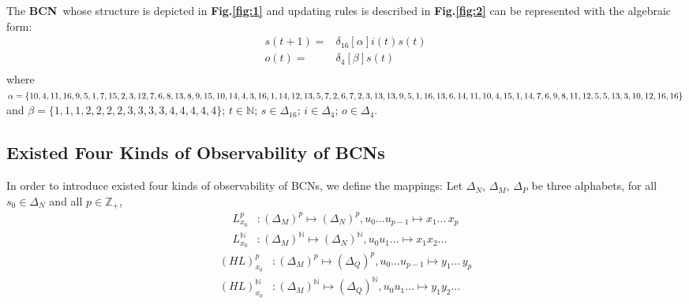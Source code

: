 \documentclass[letterpaper, 10 pt, conference]{ieeeconf}  %
\def \BCN {{\bf BCN}}
\begin{document}
The \BCN\ whose structure is depicted in {\bf Fig.\ref{fig:1}} and updating rules is described in {\bf Fig.\ref{fig:2}} can be represented with the algebraic form:
\begin{equation}
\begin{split}
s(t+1) =&\delta_{16}[\alpha]i(t)s(t)\\
o(t) =&\delta_4[\beta]s(t)\\
\end{split}
\end{equation}
where $\alpha=\{10,4,11,16,9,5,1, 7,15,2,3,12,7,6,8,13,8,9,\\15,10,14,4,3,16,1,14,12,13,5,7,2,6,7,2,3,13,13,9,5,1,\\16,13 ,6,14,11,10,4,15,1,14 ,7,6,9 ,8,11,12,5,5,13,3,10,\\12,16,16\}$ and $\beta=\{1,1,1,2,2,2,2,3,3,3,3,4,4,4,4,4\}$; $t\in \mathbb{N}$; $s\in \Delta_{16}$; $i\in \Delta_4$; $o\in \Delta_4$.
\subsection{Existed Four Kinds of Observability of BCNs}
In order to introduce existed four kinds of observability of BCNs, we define the mappings: Let $\Delta_N$, $\Delta_M$, $\Delta_P$ be three alphabets, for all $s_0\in \Delta_N$ and all $p\in \mathbb{Z}_+$,
\begin{equation}
\begin{split}
L^p_{x_0} &: (\Delta_M)^p\mapsto(\Delta_N)^p, u_0 . . . u_{p-1} \mapsto x_1 . . .\, x_p\\
L^{\mathbb{N}}_{x_0} &: (\Delta_M)^{\mathbb{N}}\mapsto(\Delta_N)^{\mathbb{N}}, u_0 u_1 . . .  \mapsto x_1 x_2 . . .
\end{split}
\end{equation}
\begin{equation}
\begin{split}
(HL)^p_{x_0} &: (\Delta_M)^p\mapsto(\Delta_Q)^p, u_0 . . . u_{p-1} \mapsto y_1 . . .\, y_p\\
(HL)^{\mathbb{N}}_{x_0} &: (\Delta_M)^{\mathbb{N}}\mapsto(\Delta_Q)^{\mathbb{N}}, u_0 u_1 . . .  \mapsto y_1 y_2 . . .
\end{split}
\end{equation}
\end{document}
